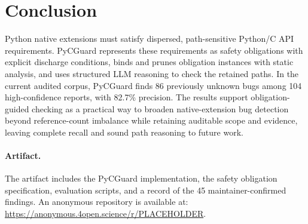 \section{Conclusion}
\label{sec:conclusion}

Python native extensions must satisfy dispersed, path-sensitive Python/C API
requirements. PyCGuard represents these requirements as safety obligations
with explicit discharge conditions, binds and prunes obligation instances with
static analysis, and uses structured LLM reasoning to check the retained
paths. In the current audited corpus, PyCGuard finds 86 previously unknown bugs
among 104 high-confidence reports, with 82.7\% precision. The results support
obligation-guided checking as a practical way to broaden native-extension bug
detection beyond reference-count imbalance while retaining auditable scope and
evidence, leaving complete recall and sound path reasoning to future work.

\paragraph{Artifact.}
The artifact includes the PyCGuard implementation, the safety obligation
specification, evaluation scripts, and a record of the 45
maintainer-confirmed findings. An anonymous repository is available at:
\url{https://anonymous.4open.science/r/PLACEHOLDER}.
